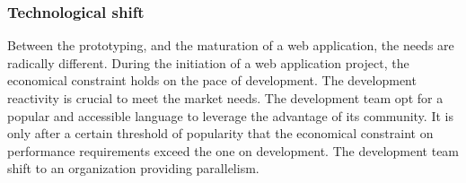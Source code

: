 

\subsubsection{Technological shift}

Between the prototyping, and the maturation of a web application, the needs are radically different.
During the initiation of a web application project, the economical constraint holds on the pace of development.
The development reactivity is crucial to meet the market needs.
The development team opt for a popular and accessible language to leverage the advantage of its community.
It is only after a certain threshold of popularity that the  economical constraint on performance requirements exceed the one on development.
The development team shift to an organization providing parallelism.




